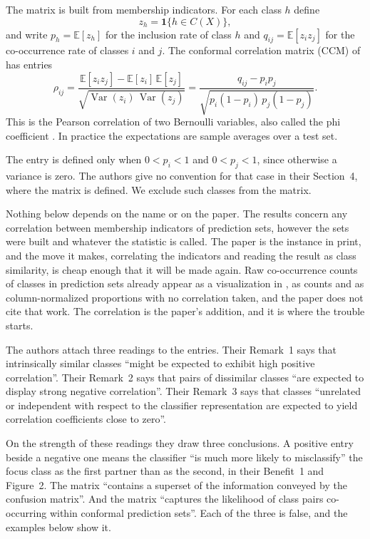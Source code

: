 \documentclass[11pt]{article}
\theoremstyle{definition}
\theoremstyle{definition}
\theoremstyle{remark}
\newcommand{\E}{\mathbb{E}}
\newcommand{\Var}{\operatorname{Var}}
\newcommand{\set}[1]{\{#1\}}
\begin{document}
The matrix is built from membership indicators. For each class $h$ define
\[
z_h = \mathbf{1}\set{h \in C(X)},
\]
and write $p_h = \E[z_h]$ for the inclusion rate of class $h$ and $q_{ij} = \E[z_i z_j]$ for the
co-occurrence rate of classes $i$ and $j$. The conformal correlation matrix (CCM) of
\citet{perlo2026} has entries
\begin{equation}\label{eq:ccm}
\rho_{ij} = \frac{\E[z_i z_j] - \E[z_i]\,\E[z_j]}{\sqrt{\Var(z_i)\,\Var(z_j)}}
          = \frac{q_{ij} - p_i p_j}{\sqrt{p_i(1-p_i)\,p_j(1-p_j)}} .
\end{equation}
This is the Pearson correlation of two Bernoulli variables, also called the phi coefficient
\citep{yule1912}. In practice the expectations are sample averages over a test set.

The entry is defined only when $0 < p_i < 1$ and $0 < p_j < 1$, since otherwise a variance is zero.
The authors give no convention for that case in their Section~4, where the matrix is defined. We
exclude such classes from the matrix.

Nothing below depends on the name or on the paper. The results concern any correlation between
membership indicators of prediction sets, however the sets were built and whatever the statistic is
called. The paper is the instance in print, and the move it makes, correlating the indicators and reading
the result as class similarity, is cheap enough that it will be made again. Raw co-occurrence
counts of classes in prediction sets already appear as a visualization in \citet{garciaceja2023},
as counts and as column-normalized proportions with no correlation taken, and the paper does not
cite that work. The correlation is the paper's addition, and it is where the trouble starts.

The authors attach three readings to the entries. Their Remark~1 says that intrinsically similar
classes ``might be expected to exhibit high positive correlation''. Their Remark~2 says that pairs of
dissimilar classes ``are expected to display strong negative correlation''. Their Remark~3 says that
classes ``unrelated or independent with respect to the classifier representation are expected to
yield correlation coefficients close to zero''.

On the strength of these readings they draw three conclusions. A positive entry beside a negative
one means the classifier ``is much more likely to misclassify'' the focus class as the first partner
than as the second, in their Benefit~1 and Figure~2. The matrix ``contains a
superset of the information conveyed by the confusion matrix''. And the matrix ``captures the
likelihood of class pairs co-occurring within conformal prediction sets''. Each of the three is
false, and the examples below show it.
\end{document}
